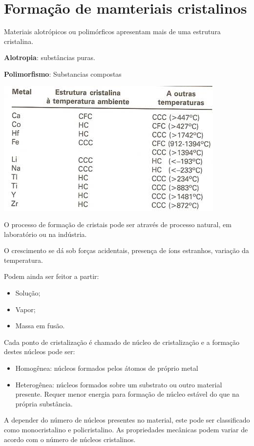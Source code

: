 \section{Formação de mamteriais cristalinos}
Materiais alotrópicos ou polimórficos apresentam mais de uma estrutura cristalina.

\textbf{Alotropia}: substâncias puras.

\textbf{Polimorfismo}: Substancias compostas

\includegraphics[scale=0.4,trim={0 0 0 0}]{figures/estruturaTemp}

O processo de formação de cristais pode ser através de processo natural, em laboratório ou na indústria.

O crescimento se dá sob forças acidentais, presença de íons estranhos, variação da temperatura.

Podem ainda ser feitor a partir:

\begin{itemize}
	\item Solução;
	\item Vapor;
	\item Massa em fusão.
\end{itemize}


Cada ponto de cristalização é chamado de núcleo de cristalização e a formação destes núcleos pode ser:

\begin{itemize}
	\item Homogênea: núcleos formados pelos átomos de próprio metal 
	\item Heterogênea: núcleos formados sobre um substrato ou outro material presente. Requer menor energia para formação de núcleo estável do que na própria substância.
\end{itemize}

A depender do número de núcleos presentes no material, este pode ser classificado como monocristalino e policristalino. As propriedades mecânicas podem variar de acordo com o número de núcleos cristalinos.

